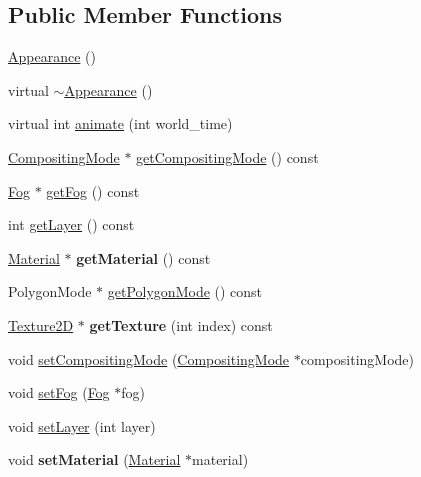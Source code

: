 \subsection*{Public Member Functions}
\begin{CompactItemize}
\item 
\hyperlink{classm3g_1_1Appearance_2e594c7b96cb5cfad839a98b57f5d42f}{Appearance} ()
\item 
virtual \hyperlink{classm3g_1_1Appearance_c05c93d7a0f286cb9471b6c667ffeee1}{$\sim$Appearance} ()
\item 
virtual int \hyperlink{classm3g_1_1Appearance_8aad1ceab4c2a03609c8a42324ce484d}{animate} (int world\_\-time)
\item 
\hyperlink{classm3g_1_1CompositingMode}{CompositingMode} $\ast$ \hyperlink{classm3g_1_1Appearance_e4045934febb56891c15e14486b239a8}{getCompositingMode} () const 
\item 
\hyperlink{classm3g_1_1Fog}{Fog} $\ast$ \hyperlink{classm3g_1_1Appearance_93143a921b998ff69576147a59eb44d4}{getFog} () const 
\item 
int \hyperlink{classm3g_1_1Appearance_df831e0e0ebf9d7e997150e497e6a6cf}{getLayer} () const 
\item 
\hypertarget{classm3g_1_1Appearance_a412c7074ed5d51f6b8b6fd89275c405}{
\hyperlink{classm3g_1_1Material}{Material} $\ast$ \textbf{getMaterial} () const }
\label{classm3g_1_1Appearance_a412c7074ed5d51f6b8b6fd89275c405}

\item 
PolygonMode $\ast$ \hyperlink{classm3g_1_1Appearance_dd3ddcefcd18339150d281b155602886}{getPolygonMode} () const 
\item 
\hypertarget{classm3g_1_1Appearance_987cc21bd78d0e4e664da717479bdd57}{
\hyperlink{classm3g_1_1Texture2D}{Texture2D} $\ast$ \textbf{getTexture} (int index) const }
\label{classm3g_1_1Appearance_987cc21bd78d0e4e664da717479bdd57}

\item 
void \hyperlink{classm3g_1_1Appearance_b4dbfc0232132aeb0a7b7c5eaade82e1}{setCompositingMode} (\hyperlink{classm3g_1_1CompositingMode}{CompositingMode} $\ast$compositingMode)
\item 
void \hyperlink{classm3g_1_1Appearance_bc1a612006d6b4c3d443ff6ab542c788}{setFog} (\hyperlink{classm3g_1_1Fog}{Fog} $\ast$fog)
\item 
void \hyperlink{classm3g_1_1Appearance_fbd2fbd594c8ee140b028f505631f682}{setLayer} (int layer)
\item 
\hypertarget{classm3g_1_1Appearance_1dfd1a55fa3cc625719dab8e95c8a2de}{
void \textbf{setMaterial} (\hyperlink{classm3g_1_1Material}{Material} $\ast$material)}
\label{classm3g_1_1Appearance_1dfd1a55fa3cc625719dab8e95c8a2de}


\end{CompactItemize}
